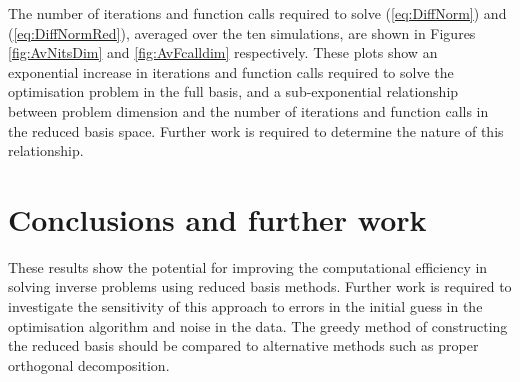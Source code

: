 
The number of iterations and function calls required to solve (\ref{eq:DiffNorm}) and (\ref{eq:DiffNormRed}), averaged over the ten simulations, are shown in Figures \ref{fig:AvNitsDim} and \ref{fig:AvFcalldim} respectively. These plots show an exponential increase in iterations and function calls required to solve the optimisation problem in the full basis, and a sub-exponential relationship between problem dimension and the number of iterations and function calls in the reduced basis space. Further work is required to determine the nature of this relationship.

\section{Conclusions and further work}
These results show the potential for improving the computational efficiency in solving inverse problems using reduced basis methods. Further work is required to investigate the sensitivity of this approach to errors in the initial guess in the optimisation algorithm and noise in the data. The greedy method of constructing the reduced basis should be compared to alternative methods such as proper orthogonal decomposition. 


%
%

%                                                                                                      